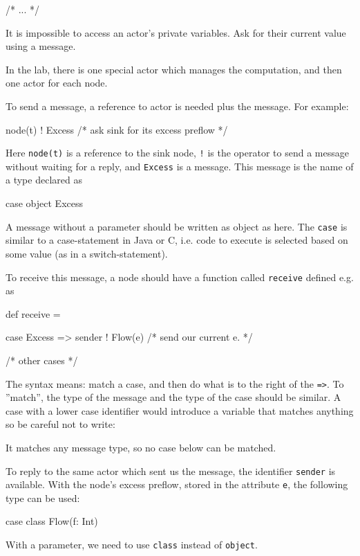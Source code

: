\documentclass{forsete}
\begin{document}
{\begin{ccode}
{        /* ... */
}
\end{ccode}

It is impossible to access an actor's private variables. Ask for their current value using a message.

In the lab, there is one special actor which manages the computation, and then one actor for each node.

To send a message, a reference to actor is needed plus the message. For example:
\begin{ccode}
node(t) ! Excess	/* ask sink for its excess preflow */
\end{ccode}
Here {\tt node(t)} is a reference to the sink node, \verb.!. is the operator to send a message without 
waiting for a reply, and \verb.Excess. is a message. This message is the name of a type declared as
\begin{ccode}
case object Excess
\end{ccode}
A message without a parameter should be written as object as here. The \verb.case. is similar to 
a case-statement in Java or C, i.e. code to execute is selected based on some value (as in a switch-statement).

To receive this message, a node should have a function called {\tt receive} defined e.g. as
\begin{ccode}
def receive = {

case Excess => { sender ! Flow(e) /* send our current e. */ }

/* other cases */

}
\end{ccode}

The syntax means: match a case, and then do what is to the right of the \verb.=>..
To ''match'', the type of the message and the type of the case should be similar.
A case with a lower case identifier would introduce a variable that matches anything so be 
careful not to write:
\begin{ccode}
case excess => { sender ! Flow(e) /* reply with our current e. */
\end{ccode}
It matches any message type, so no case below can be matched.

To reply to the same actor which sent us the message, the identifier \verb.sender. is available.
With the node's excess preflow, stored in the attribute \verb.e., the following type can be used:
\begin{ccode}
case class Flow(f: Int)
\end{ccode}
With a parameter, we need to use \verb.class. instead of \verb.object..

}
\end{document}
